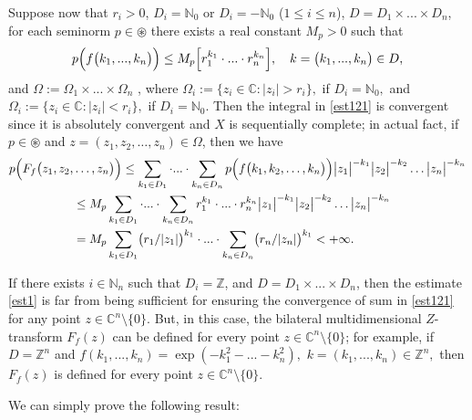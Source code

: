 \documentclass{amsart}
\theoremstyle{definition}
\theoremstyle{remark}
\numberwithin{equation}{section}
\begin{document}
Suppose now that $r_{i}>0$, $D_{i}={\mathbb N}_{0}$ or $D_{i}=-{\mathbb N}_{0}$ ($1\leq i\leq n$), $D=D_{1}\times ... \times D_{n}$, for each seminorm $p\in \circledast$ there exists a real constant $M_{p}>0$ such that 
\begin{align}\label{est1}
p\Bigl(f\bigl(k_{1},...,k_{n}\bigr)\Bigr)\leq M_{p}\Bigl[r_{1}^{k_{1}}\cdot ... \cdot r_{n}^{k_{n}}\Bigr],\quad k=\bigl(k_{1},...,k_{n}\bigr)\in D, 
\end{align}
and $\Omega :=\Omega_{1} \times ... \times \Omega_{n}$ , where $\Omega_{i}:=\{z_{i}\in {\mathbb C} : |z_{i}|>r_{i}\},$ if $D_{i}={\mathbb N}_{0},$ and $\Omega_{i}:=\{z_{i}\in {\mathbb C} : |z_{i}|<r_{i}\},$ if $D_{i}={\mathbb N}_{0}$.
Then the integral in \eqref{est121} is convergent since it is absolutely convergent and $X$ is sequentially complete; in actual fact, if $p\in \circledast$ and $z=(z_{1},z_{2},\ldots ,z_{n})\in \Omega $, then we have{\small
\begin{align*} 
p\Bigl( F_{f}\bigl(z_{1},z_{2}, & \ldots ,z_{n}\bigr)\Bigr) \leq \sum _{k_{1}\in D_{1} }\cdot ... \cdot \sum _{k_{n}\in D_{n} }p\Bigl(f\bigl(k_{1},k_{2},\ldots ,k_{n}\bigr)\Bigr)\bigl|z_{1}\bigr|^{-k_{1}}\bigl|z_{2}\bigr|^{-k_{2}}\ldots \bigl|z_{n}\bigr|^{-k_{n}}
\\& \leq M_{p}\sum _{k_{1}\in D_{1} }\cdot ... \cdot \sum _{k_{n}\in D_{n} }r_{1}^{k_{1}}\cdot ... \cdot r_{n}^{k_{n}}\bigl|z_{1}\bigr|^{-k_{1}}\bigl|z_{2}\bigr|^{-k_{2}}\ldots \bigl|z_{n}\bigr|^{-k_{n}}
\\& = M_{p}\sum _{k_{1}\in D_{1} }\bigl( r_{1}/|z_{1}|\bigr)^{k_{1}} \cdot ... \cdot \sum _{k_{n}\in D_{n} }\bigl( r_{n}/|z_{n}|\bigr)^{k_{1}}<+\infty.
\end{align*}}

If there exists $i\in {\mathbb N}_{n}$ such that $D_{i}={\mathbb Z}$, and $D=D_{1}\times ... \times D_{n}$, then the estimate \eqref{est1} is far from being sufficient for ensuring the convergence of sum in \eqref{est121} for any point $z\in {\mathbb C}^{n}\setminus \{0\}.$ But, in this case, the bilateral multidimensional $Z$-transform $F_{f}(z)$ can be defined for every point $z\in {\mathbb C}^{n}\setminus \{0\}$; for example, if $D={\mathbb Z}^{n}  $ and $f(k_{1},...,k_{n})=\exp(-k_{1}^{2}-...-k_{n}^{2}),$ $k=(k_{1},...,k_{n})\in {\mathbb Z}^{n},$ then $F_{f}(z)$ is defined for every point $z\in {\mathbb C}^{n}\setminus \{0\}.$ 

We can simply prove the following result:
\end{document}

